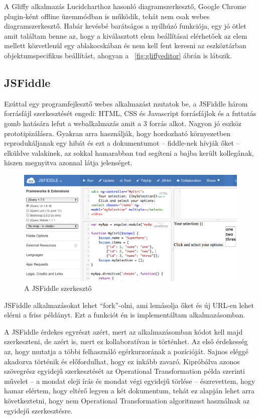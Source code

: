 A Gliffy alkalmazás Lucidcharthoz hasonló diagramszerkesztő, Google Chrome plugin-ként offline üzemmódban is működik, tehát nem csak webes diagramszerkesztő. Habár kevésbé barátságos a nyílhúzó funkciója, egy jó ötlet amit találtam benne az, hogy a kiválasztott elem beállításai elérhetőek az elem mellett közvetlenül egy ablakocskában és nem kell fent keresni az eszköztárban objektumspecifikus beállítást, ahogyan a ~\ref{fig:gliffyeditor} ábrán is látszik. 


\subsection{JSFiddle}

Ezúttal egy programfejlesztő webes alkalmazást mutatok be, a JSFiddle három forrásfájl szerkesztését engedi: HTML, CSS és Javascript forrásfájlok és a futtatás gomb hatására lefut a webalkalmazás amit a 3 forrás alkot. Nagyon jó eszköz prototipizálásra. Gyakran arra használják, hogy hordozható környezetben reprodukáljanak egy hibát és ezt a dokumentumot -- fiddle-nek hívják őket -- elküldve valakinek, az sokkal hamarabban tud segíteni a bajba került kollegának, hiszen megnyitva azonnal látja jelenséget. 

\begin{figure}[!ht]
\centering
\includegraphics[width=16cm,keepaspectratio]{figures/fiddle.png}
\caption{A JSFiddle szerkesztő}
\label{fig:fiddleeditor}
\end{figure}

JSFiddle alkalmazásokat lehet ``fork''-olni, ami lemásolja őket és új URL-en lehet elérni a friss példányt. Ezt a funkciót én is implementáltam alkalmazásomban.

A JSFiddle érdekes egyrészt azért, mert az alkalmazásomban kódot kell majd szerkeszteni, de azért is, mert ez kollaboratívan is történhet. Az első érdekesség az, hogy mutatja a többi felhasználó egérkurzorának a pozícióját. Sajnos eléggé akadozva történik és előfordulhat, hogy ez inkább zavaró. Kipróbálva azonos szövegrész egyidejű szerkesztését az Operational Transformation példa szerinti művelet -- a mondat eleji írás és mondat végi egyidejű törlése -- észrevettem, hogy hamar elértem, hogy eltérő legyen a két dokumentum, tehát ez alapján lehet arra következtetni, hogy nem Operational Transformation algoritmust használnak az egyidejű szerkesztésre.


